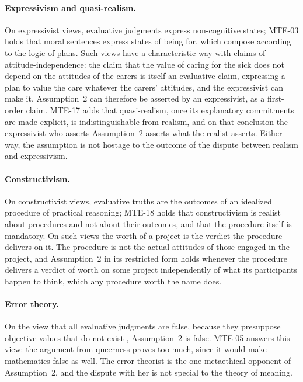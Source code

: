 \paragraph{Expressivism and quasi-realism.} On expressivist views, evaluative judgments express non-cognitive states; MTE-03 holds that moral sentences express states of being for, which compose according to the logic of plans. Such views have a characteristic way with claims of attitude-independence: the claim that the value of caring for the sick does not depend on the attitudes of the carers is itself an evaluative claim, expressing a plan to value the care whatever the carers' attitudes, and the expressivist can make it. Assumption~2 can therefore be asserted by an expressivist, as a first-order claim. MTE-17 adds that quasi-realism, once its explanatory commitments are made explicit, is indistinguishable from realism, and on that conclusion the expressivist who asserts Assumption~2 asserts what the realist asserts. Either way, the assumption is not hostage to the outcome of the dispute between realism and expressivism.

\paragraph{Constructivism.} On constructivist views, evaluative truths are the outcomes of an idealized procedure of practical reasoning; MTE-18 holds that constructivism is realist about procedures and not about their outcomes, and that the procedure itself is mandatory. On such views the worth of a project is the verdict the procedure delivers on it. The procedure is not the actual attitudes of those engaged in the project, and Assumption~2 in its restricted form holds whenever the procedure delivers a verdict of worth on some project independently of what its participants happen to think, which any procedure worth the name does.

\paragraph{Error theory.} On the view that all evaluative judgments are false, because they presuppose objective values that do not exist \citep{Mackie1977}, Assumption~2 is false. MTE-05 answers this view: the argument from queerness proves too much, since it would make mathematics false as well. The error theorist is the one metaethical opponent of Assumption~2, and the dispute with her is not special to the theory of meaning.

